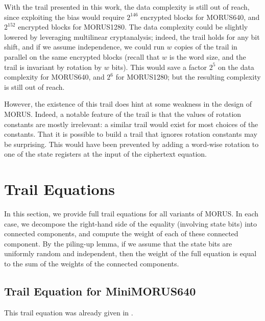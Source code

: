 \documentclass{llncs}
\newcommand{\cipher}[1]{\textsf{#1}}
\begin{document}
With the trail presented in this work, the data complexity is still out of reach, since exploiting the bias would require $2^{146}$ encrypted blocks for \cipher{MORUS640}, and $2^{152}$ encrypted blocks for \cipher{MORUS1280}. The data complexity could be slightly lowered by leveraging multilinear cryptanalysis; indeed, the trail holds for any bit shift, and if we assume independence, we could run $w$ copies of the trail in parallel on the same encrypted blocks (recall that $w$ is the word size, and the trail is invariant by rotation by $w$ bits). This would save a factor $2^5$ on the data complexity for \cipher{MORUS640}, and $2^6$ for \cipher{MORUS1280}; but the resulting complexity is still out of reach.

However, the existence of this trail does hint at some weakness in the design of \cipher{MORUS}. Indeed, a notable feature of the trail is that the values of rotation constants are mostly irrelevant: a similar trail would exist for most choices of the constants. That it is possible to build a trail that ignores rotation constants may be surprising. This would have been prevented by adding a word-wise rotation to one of the state registers at the input of the ciphertext equation.

\appendix

\section{Trail Equations}
\label{sec:traileq}

In this section, we provide full trail equations for all variants of \cipher{MORUS}. In each case, we decompose the right-hand side of the equality (involving state bits) into connected components, and compute the weight of each of these connected component. By the piling-up lemma, if we assume that the state bits are uniformly random and independent, then the weight of the full equation is equal to the sum of the weights of the connected components.

\subsection{Trail Equation for \cipher{MiniMORUS640}}

This trail equation was already given in .
\end{document}
